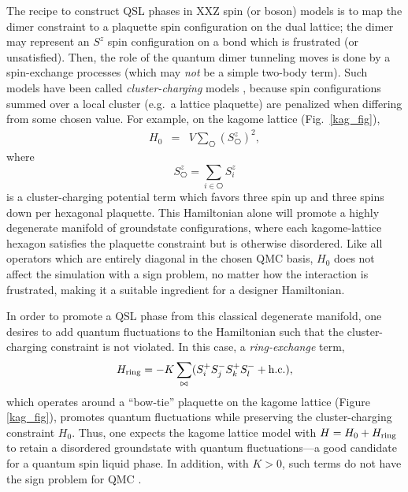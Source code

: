 \documentclass[10pt,pre,aps,twocolumn,showpacs,subscriptaddresses,floatfix]{revtex4}
\begin{document}
The recipe to construct QSL phases in XXZ spin (or boson) models is to map the dimer constraint to a plaquette spin configuration on the dual lattice; the dimer may represent an $S^z$ spin configuration on a bond which is frustrated (or unsatisfied).  Then, the role of the quantum dimer tunneling moves is done by a spin-exchange processes (which may {\it not} be a simple two-body term).  Such models have been called
{\it cluster-charging} models \cite{Isakov2}, because spin configurations summed over a local cluster (e.g.~a lattice plaquette) are penalized when differing from some chosen value.  For example, on the kagome lattice (Fig.~\ref{kag_fig}),
\begin{eqnarray}
H_0 &=& V \sum_{\hexagon} (S^z_{\hexagon})^2,  \label{H0}
\end{eqnarray}
where 
\begin{equation}
S^z_{\hexagon} = \sum_{i \in \hexagon}S^z_i
\end{equation}
is a cluster-charging potential term which favors three spin up and three spins down per hexagonal plaquette.  This Hamiltonian alone will promote a highly degenerate manifold of groundstate configurations, where each kagome-lattice hexagon satisfies the plaquette constraint but is otherwise disordered.  
Like all operators which are entirely diagonal in the chosen QMC basis, $H_0$ does not affect the simulation with a sign problem, no matter how the interaction is frustrated, making it a suitable ingredient for a designer Hamiltonian.

In order to promote a QSL phase from this classical degenerate manifold, one desires to add quantum fluctuations to the Hamiltonian such that the cluster-charging constraint is not violated.  In this case, a {\it ring-exchange} term, 
\begin{eqnarray}
H_{\rm ring} = -K \sum_{\bowtie} ( S_i^{+} S_j^{-} S_k^{+} S_l^{-} + {\rm h.c.} ),
\end{eqnarray} 
which operates around a ``bow-tie'' plaquette on the kagome lattice (Figure \ref{kag_fig}),
promotes quantum fluctuations while preserving the cluster-charging constraint $H_0$.  Thus, one expects the kagome lattice model with $H = H_0 + H_{\rm ring}$ to retain a disordered groundstate with quantum fluctuations---a good candidate for a quantum spin liquid phase.  In addition, with $K>0$, such terms do not have the sign problem for QMC \cite{JKqmc}.
\end{document}
